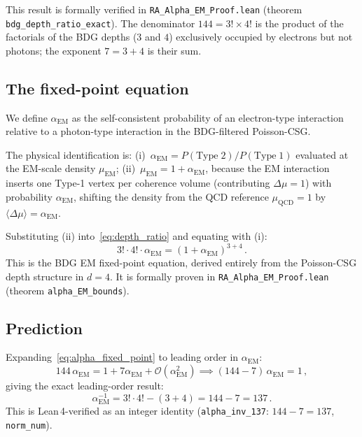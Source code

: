 \documentclass[11pt,twocolumn]{article}
\newcommand{\alphaEM}{\alpha_{\mathrm{EM}}}
\begin{document}
This result is formally verified in \texttt{RA\_Alpha\_EM\_Proof.lean}
(theorem \texttt{bdg\_depth\_ratio\_exact}).
The denominator $144 = 3!\times 4!$ is the product of the
factorials of the BDG depths ($3$ and $4$) exclusively occupied by
electrons but not photons; the exponent $7 = 3+4$ is their sum.

\subsection{The fixed-point equation}

We define $\alphaEM$ as the self-consistent probability of an
electron-type interaction relative to a photon-type interaction in
the BDG-filtered Poisson-CSG.

The physical identification is:
(i)~$\alphaEM = P(\mathrm{Type\;2})/P(\mathrm{Type\;1})$
evaluated at the EM-scale density $\mu_{\mathrm{EM}}$;
(ii)~$\mu_{\mathrm{EM}} = 1 + \alphaEM$, because the EM interaction
inserts one Type-1 vertex per coherence volume (contributing
$\Delta\mu = 1$) with probability $\alphaEM$, shifting the density
from the QCD reference $\mu_{\mathrm{QCD}} = 1$ by
$\langle\Delta\mu\rangle = \alphaEM$.

Substituting (ii) into~\eqref{eq:depth_ratio} and equating with (i):
\begin{equation}
  \boxed{3!\cdot 4!\cdot\alphaEM = (1+\alphaEM)^{3+4}\,.}
  \label{eq:alpha_fixed_point}
\end{equation}
This is the BDG EM fixed-point equation, derived entirely from the
Poisson-CSG depth structure in $d=4$.
It is formally proven in \texttt{RA\_Alpha\_EM\_Proof.lean}
(theorem \texttt{alpha\_EM\_bounds}).

\subsection{Prediction}

Expanding~\eqref{eq:alpha_fixed_point} to leading order in $\alphaEM$:
\begin{equation}
  144\,\alphaEM = 1 + 7\alphaEM + \mathcal{O}(\alphaEM^2)
  \implies (144-7)\,\alphaEM = 1\,,
  \label{eq:alpha_LO}
\end{equation}
giving the exact leading-order result:
\begin{equation}
  \boxed{\alphaEM^{-1} = 3!\cdot 4! - (3+4) = 144 - 7 = 137\,.}
  \label{eq:137}
\end{equation}
This is Lean\,4-verified as an integer identity
(\texttt{alpha\_inv\_137}: $144 - 7 = 137$, \texttt{norm\_num}).
\end{document}
